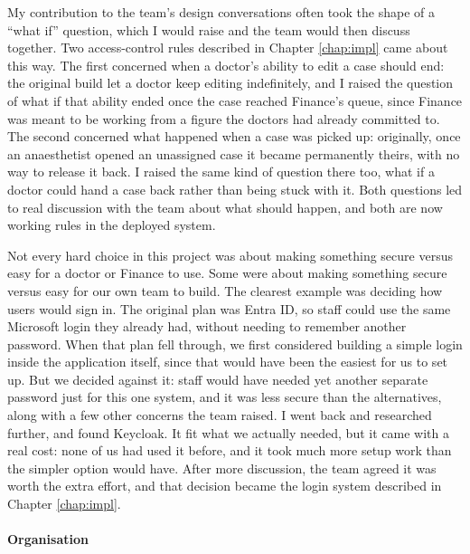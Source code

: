 My contribution to the team's design conversations often took the shape of a ``what if'' question, which I would raise and the team would then discuss together. Two access-control rules described in Chapter \ref{chap:impl} came about this way. The first concerned when a doctor's ability to edit a case should end: the original build let a doctor keep editing indefinitely, and I raised the question of what if that ability ended once the case reached Finance's queue, since Finance was meant to be working from a figure the doctors had already committed to. The second concerned what happened when a case was picked up: originally, once an anaesthetist opened an unassigned case it became permanently theirs, with no way to release it back. I raised the same kind of question there too, what if a doctor could hand a case back rather than being stuck with it. Both questions led to real discussion with the team about what should happen, and both are now working rules in the deployed system.

Not every hard choice in this project was about making something secure versus easy for a doctor or Finance to use. Some were about making something secure versus easy for our own team to build. The clearest example was deciding how users would sign in. The original plan was Entra ID, so staff could use the same Microsoft login they already had, without needing to remember another password. When that plan fell through, we first considered building a simple login inside the application itself, since that would have been the easiest for us to set up. But we decided against it: staff would have needed yet another separate password just for this one system, and it was less secure than the alternatives, along with a few other concerns the team raised. I went back and researched further, and found Keycloak. It fit what we actually needed, but it came with a real cost: none of us had used it before, and it took much more setup work than the simpler option would have. After more discussion, the team agreed it was worth the extra effort, and that decision became the login system described in Chapter \ref{chap:impl}.

\paragraph{Organisation}

